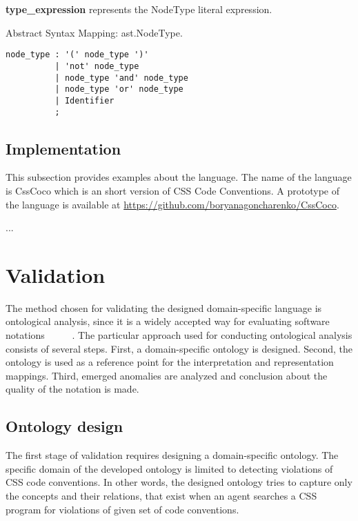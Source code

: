\documentclass[parskip=full]{uvamscse}
\begin{document}
\begin{description}
\item\textbf{type\_expression} represents the NodeType literal expression.

Abstract Syntax Mapping: ast.NodeType.

\begin{snippet}
\begin{verbatim}
node_type : '(' node_type ')'
          | 'not' node_type
          | node_type 'and' node_type
          | node_type 'or' node_type
          | Identifier
          ;
\end{verbatim}
\end{snippet}

\end{description}

\subsection{Implementation}

This subsection provides examples about the language. The name of the language is CssCoco which is
an short version of CSS Code Conventions. A prototype of the language is available at
\url{https://github.com/boryanagoncharenko/CssCoco}.

...

\section{Validation}

The method chosen for validating the designed domain-specific language is ontological analysis,
since it is a widely accepted way for evaluating software notations~\cite{opdahl2002ontological}
~\cite{green2000integrated}~\cite{moody2009physics}~\cite{parsons1997using}~\cite{weber1996analytical}.
The particular approach used for conducting ontological analysis consists of several steps. First, a
domain-specific ontology is designed. Second, the ontology is used as a reference point for the
interpretation and representation mappings. Third, emerged anomalies are analyzed and conclusion
about the quality of the notation is made.

\subsection{Ontology design}

The first stage of validation requires designing a domain-specific ontology. The specific domain of
the developed ontology is limited to detecting violations of CSS code conventions. In other words,
the designed ontology tries to capture only the concepts and their relations, that exist when an
agent searches a CSS program for violations of given set of code conventions.
\end{document}
